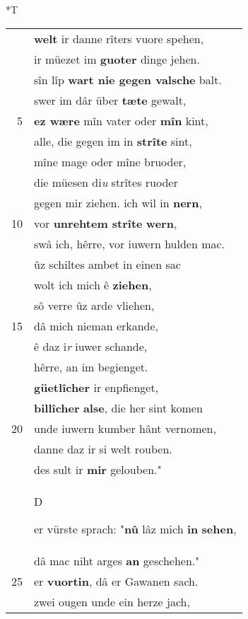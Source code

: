 \documentclass[8pt,a4paper,notitlepage]{article}
\begin{document}
\begin{table}[ht]
\begin{minipage}[t]{0.5\linewidth}
\end{minipage}
\hspace{0.5cm}
\begin{minipage}[t]{0.5\linewidth}
\small
\begin{center}*T
\end{center}
\begin{tabular}{rl}
 & \textbf{welt} ir danne rîters vuore spehen,\\ 
 & ir müezet im \textbf{guoter} dinge jehen.\\ 
 & sîn lîp \textbf{wart nie gegen valsche} balt.\\ 
 & swer im dâr über \textbf{tæte} gewalt,\\ 
5 & \textbf{ez wære} mîn vater oder \textbf{mîn} kint,\\ 
 & alle, die gegen im in \textbf{strîte} sint,\\ 
 & mîne mage oder mîne bruoder,\\ 
 & die müesen di\textit{u} strîtes ruoder\\ 
 & gegen mir ziehen. ich wil in \textbf{nern},\\ 
10 & vor \textbf{unrehtem strîte} \textbf{wern},\\ 
 & swâ ich, hêrre, vor iuwern hulden mac.\\ 
 & ûz schiltes ambet in einen sac\\ 
 & wolt ich mich ê \textbf{ziehen},\\ 
 & sô verre ûz arde vliehen,\\ 
15 & dâ mich nieman erkande,\\ 
 & ê daz i\textit{r} iuwer schande,\\ 
 & hêrre, an im begienget.\\ 
 & \textbf{güetlîcher} ir enpfienget,\\ 
 & \textbf{billîcher} \textbf{alse}, die her sint komen\\ 
20 & unde iuwern kumber hânt vernomen,\\ 
 & danne daz ir si welt rouben.\\ 
 & des sult ir \textbf{mir} gelouben."\\ 
 & \begin{large}D\end{large}er vürste sprach: "\textbf{nû} lâz mich \textbf{in} \textbf{sehen},\\ 
 & dâ mac niht arges \textbf{an} geschehen."\\ 
25 & er \textbf{vuortin}, dâ er Gawanen sach.\\ 
 & zwei ougen unde ein herze jach,\\ 

\end{tabular}
\end{minipage}
\end{table}
\end{document}
